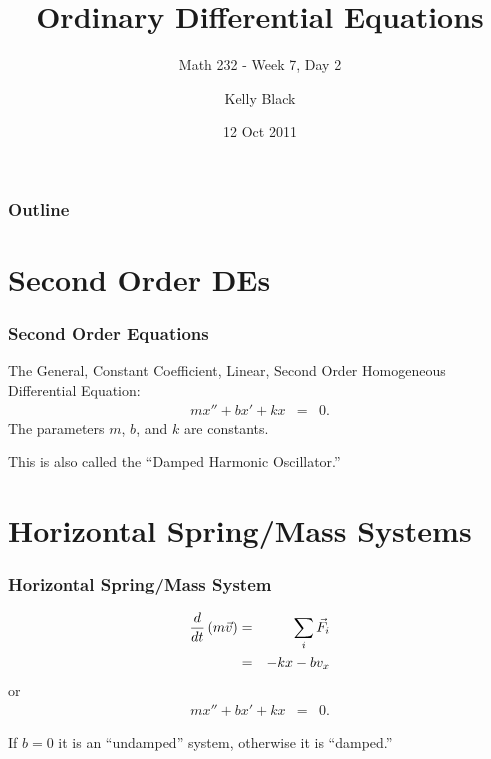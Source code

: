 
\title{Ordinary Differential Equations}
\subtitle{Math 232 - Week 7, Day 2}

\author{Kelly Black}
\date{12 Oct 2011}

\begin{frame}
  \titlepage
\end{frame}

\begin{frame}
  \frametitle{Outline}
\end{frame}


\section{Second Order DEs}


\begin{frame}
  \frametitle{Second Order Equations}

  The General, Constant Coefficient, Linear, Second Order Homogeneous
  Differential Equation:
  \begin{eqnarray*}
    m x'' + b x' + kx & = & 0.
  \end{eqnarray*}
  The parameters $m$, $b$, and $k$ are constants.

  This is also called the ``Damped Harmonic Oscillator.''

\end{frame}

\section{Horizontal Spring/Mass Systems}

\begin{frame}
  \frametitle{Horizontal Spring/Mass System}

  \begin{eqnarray*}
    \frac{d}{dt} \left( m \vec{v} \right) & = & \sum_i \vec{F}_i \\
    & = & -kx - bv_x 
  \end{eqnarray*}
  or
  \begin{eqnarray*}
    mx'' + bx' + kx & = & 0.
  \end{eqnarray*}

  If $b=0$ it is an ``undamped'' system, otherwise it is ``damped.''

\end{frame}


